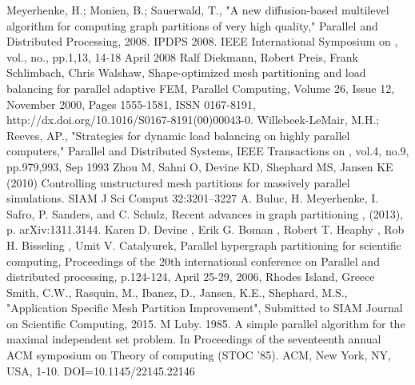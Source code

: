 \documentclass{thesis}
\begin{document}
\begin{singlespace}
\begin{thebibliography}{99}
 Meyerhenke, H.; Monien, B.; Sauerwald, T., "A new 
diffusion-based multilevel algorithm for computing graph partitions of very 
high quality," Parallel and Distributed Processing, 2008. IPDPS 2008. IEEE 
International Symposium on , vol., no., pp.1,13, 14-18 April 2008
 Ralf Diekmann, Robert Preis, Frank Schlimbach, Chris 
Walshaw, Shape-optimized mesh partitioning and load balancing for parallel 
adaptive FEM, Parallel Computing, Volume 26, Issue 12, November 2000, Pages 
1555-1581, ISSN 0167-8191, http://dx.doi.org/10.1016/S0167-8191(00)00043-0.
 Willebeek-LeMair, M.H.; Reeves, AP., "Strategies for 
dynamic load balancing on highly parallel computers," Parallel and Distributed 
Systems, IEEE Transactions on , vol.4, no.9, pp.979,993, Sep 1993
 Zhou M, Sahni O, Devine KD, Shephard MS, Jansen KE (2010) 
Controlling unstructured mesh partitions for massively parallel simulations. 
SIAM J Sci Comput 32:3201–3227
 A. Buluc, H. Meyerhenke, I. Safro, P. Sanders, and C. 
Schulz, Recent advances in graph partitioning , (2013), p. arXiv:1311.3144.
  Karen D. Devine , Erik G. Boman , Robert T. Heaphy , 
Rob H. Bisseling , Umit V. Catalyurek, Parallel hypergraph partitioning for 
scientific computing, Proceedings of the 20th international conference on 
Parallel and distributed processing, p.124-124, April 25-29, 2006, Rhodes 
Island, Greece 
 Smith, C.W., Rasquin, M., Ibanez, D., Jansen, K.E., Shephard,
M.S., "Application Specific Mesh Partition Improvement", Submitted to SIAM Journal on Scientific Computing, 2015.
 M Luby. 1985. A simple parallel algorithm for the maximal independent set problem. In Proceedings of the seventeenth annual ACM symposium on Theory of computing (STOC '85). ACM, New York, NY, USA, 1-10. DOI=10.1145/22145.22146 
\end{thebibliography}
\end{singlespace}
\end{document}
